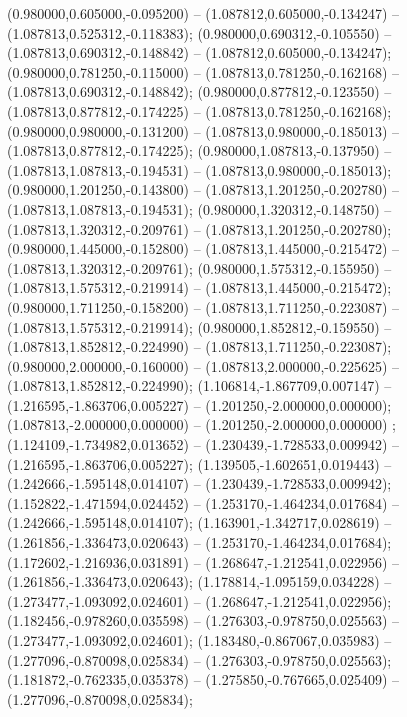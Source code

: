 (0.980000,0.605000,-0.095200) -- (1.087812,0.605000,-0.134247) -- (1.087813,0.525312,-0.118383);
 (0.980000,0.690312,-0.105550) -- (1.087813,0.690312,-0.148842) -- (1.087812,0.605000,-0.134247);
 (0.980000,0.781250,-0.115000) -- (1.087813,0.781250,-0.162168) -- (1.087813,0.690312,-0.148842);
 (0.980000,0.877812,-0.123550) -- (1.087813,0.877812,-0.174225) -- (1.087813,0.781250,-0.162168);
 (0.980000,0.980000,-0.131200) -- (1.087813,0.980000,-0.185013) -- (1.087813,0.877812,-0.174225);
 (0.980000,1.087813,-0.137950) -- (1.087813,1.087813,-0.194531) -- (1.087813,0.980000,-0.185013);
 (0.980000,1.201250,-0.143800) -- (1.087813,1.201250,-0.202780) -- (1.087813,1.087813,-0.194531);
 (0.980000,1.320312,-0.148750) -- (1.087813,1.320312,-0.209761) -- (1.087813,1.201250,-0.202780);
 (0.980000,1.445000,-0.152800) -- (1.087813,1.445000,-0.215472) -- (1.087813,1.320312,-0.209761);
 (0.980000,1.575312,-0.155950) -- (1.087813,1.575312,-0.219914) -- (1.087813,1.445000,-0.215472);
 (0.980000,1.711250,-0.158200) -- (1.087813,1.711250,-0.223087) -- (1.087813,1.575312,-0.219914);
 (0.980000,1.852812,-0.159550) -- (1.087813,1.852812,-0.224990) -- (1.087813,1.711250,-0.223087);
 (0.980000,2.000000,-0.160000) -- (1.087813,2.000000,-0.225625) -- (1.087813,1.852812,-0.224990);
 (1.106814,-1.867709,0.007147) -- (1.216595,-1.863706,0.005227) -- (1.201250,-2.000000,0.000000);
 (1.087813,-2.000000,0.000000) -- (1.201250,-2.000000,0.000000) ;
 (1.124109,-1.734982,0.013652) -- (1.230439,-1.728533,0.009942) -- (1.216595,-1.863706,0.005227);
 (1.139505,-1.602651,0.019443) -- (1.242666,-1.595148,0.014107) -- (1.230439,-1.728533,0.009942);
 (1.152822,-1.471594,0.024452) -- (1.253170,-1.464234,0.017684) -- (1.242666,-1.595148,0.014107);
 (1.163901,-1.342717,0.028619) -- (1.261856,-1.336473,0.020643) -- (1.253170,-1.464234,0.017684);
 (1.172602,-1.216936,0.031891) -- (1.268647,-1.212541,0.022956) -- (1.261856,-1.336473,0.020643);
 (1.178814,-1.095159,0.034228) -- (1.273477,-1.093092,0.024601) -- (1.268647,-1.212541,0.022956);
 (1.182456,-0.978260,0.035598) -- (1.276303,-0.978750,0.025563) -- (1.273477,-1.093092,0.024601);
 (1.183480,-0.867067,0.035983) -- (1.277096,-0.870098,0.025834) -- (1.276303,-0.978750,0.025563);
 (1.181872,-0.762335,0.035378) -- (1.275850,-0.767665,0.025409) -- (1.277096,-0.870098,0.025834);
